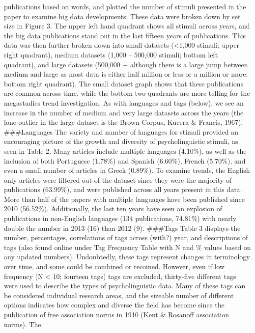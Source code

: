 \documentclass[english,man]{apa6}
\theoremstyle{definition}
\theoremstyle{definition}
\theoremstyle{definition}
\theoremstyle{remark}
\begin{document}
publications based on words, and plotted the number of stimuli presented
in the paper to examine big data developments. These data were broken
down by set size in Figure 3. The upper left hand quadrant shows all
stimuli across years, and the big data publications stand out in the
last fifteen years of publications. This data was then further broken
down into small datasets (\textless{}1,000 stimuli; upper right
quadrant), medium datasets (1,000 -- 500,000 stimuli; bottom left
quadrant), and large datasets (500,000 + although there is a large jump
between medium and large as most data is either half million or less or
a million or more; bottom right quadrant). The small dataset graph shows
that these publications are common across time, while the bottom two
quadrants are more telling for the megastudies trend investigation. As
with languages and tags (below), we see an increase in the number of
medium and very large datasets across the years (the lone outlier in the
large dataset is the Brown Corpus, Kucera \& Francis, 1967).
\#\#\#Languages The variety and number of languages for stimuli provided
an encouraging picture of the growth and diversity of psycholinguistic
stimuli, as seen in Table 2. Many articles include multiple languages
(4.10\%), as well as the inclusion of both Portuguese (1.78\%) and
Spanish (6.60\%), French (5.70\%), and even a small number of articles
in Greek (0.89\%). To examine trends, the English only articles were
filtered out of the dataset since they were the majority of publications
(63.99\%), and were published across all years present in this data.
More than half of the papers with multiple languages have been published
since 2010 (56.52\%). Additionally, the last ten years have seen an
explosion of publications in non-English languages (134 publications,
74.81\%) with nearly double the number in 2013 (16) than 2012 (9).
\#\#\#Tags Table 3 displays the number, percentages, correlations of
tags across (with?) year, and descriptions of tags (also found online
under Tag Frequency Table with N and \% values based on any updated
numbers). Undoubtedly, these tags represent changes in terminology over
time, and some could be combined or recoined. However, even if low
frequency (N \textless{} 10; fourteen tags) tags are excluded,
thirty-five different tags were used to describe the types of
psycholinguistic data. Many of these tags can be considered individual
research areas, and the sizeable number of different options indicates
how complex and diverse the field has become since the publication of
free association norms in 1910 (Kent \& Rosanoff association norms). The
\end{document}
